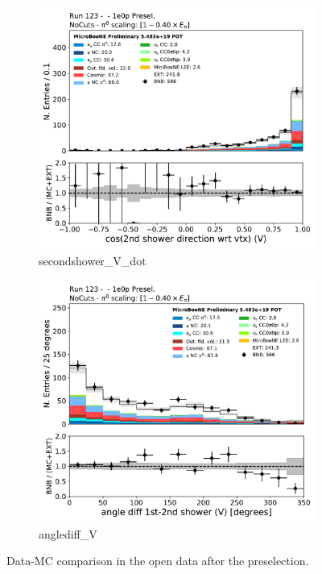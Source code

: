 \begin{figure}[H] 
\begin{center}
    \begin{subfigure}[b]{0.3\textwidth}
    \centering
    \includegraphics[width=1.00\textwidth]{1e0p/dataMCRun123/secondshower_V_dot.pdf}
    \caption{\label{fig:1e0p:dataMCRun1:secondshower_V_dot} secondshower\_V\_dot }
    \end{subfigure}
    \begin{subfigure}[b]{0.3\textwidth}
    \centering
    \includegraphics[width=1.00\textwidth]{1e0p/dataMCRun123/anglediff_V.pdf}
    \caption{\label{fig:1e0p:dataMCRun1:anglediff_V} anglediff\_V }
    \end{subfigure}
\caption{\label{fig:1e0p:dataMCRun1:pi02}Data-MC comparison in the open data after the \zpsel preselection.}
\end{center}
\end{figure}


